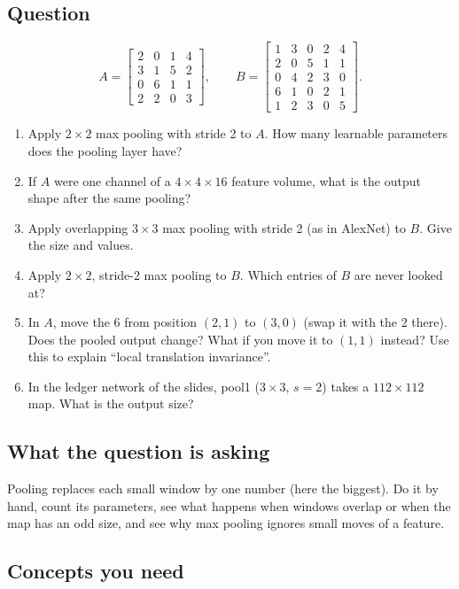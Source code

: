 \documentclass[12pt,a4paper]{article}
\newcommand{\hlq}[1]{{\setlength{\fboxsep}{1.5pt}\colorbox{yellow}{#1}}}
\begin{document}
\subsection*{Question}
\[
A=\begin{bmatrix}2&0&1&4\\3&1&5&2\\0&6&1&1\\2&2&0&3\end{bmatrix},\qquad
B=\begin{bmatrix}1&3&0&2&4\\2&0&5&1&1\\0&4&2&3&0\\6&1&0&2&1\\1&2&3&0&5\end{bmatrix}.
\]
\begin{enumerate}[label=(\alph*)]
\item[\hlq{(a)}] Apply $2\times2$ max pooling with stride 2 to $A$. How many learnable parameters does the pooling layer have?
\item[\hlq{(b)}] If $A$ were one channel of a $4\times4\times16$ feature volume, what is the output shape after the same pooling?
\item[\hlq{(c)}] Apply overlapping $3\times3$ max pooling with stride 2 (as in AlexNet) to $B$. Give the size and values.
\item[\hlq{(d)}] Apply $2\times2$, stride-2 max pooling to $B$. Which entries of $B$ are never looked at?
\item[(e)] In $A$, move the 6 from position $(2,1)$ to $(3,0)$ (swap it with the 2 there). Does the pooled output change? What if you move it to $(1,1)$ instead? Use this to explain ``local translation invariance''.
\item[(f)] In the ledger network of the slides, pool1 ($3\times3$, $s=2$) takes a $112\times112$ map. What is the output size?
\end{enumerate}

\subsection*{What the question is asking}
Pooling replaces each small window by one number (here the biggest). Do it by hand, count its parameters, see what happens when windows overlap or when the map has an odd size, and see why max pooling ignores small moves of a feature.

\subsection*{Concepts you need}
\end{document}
